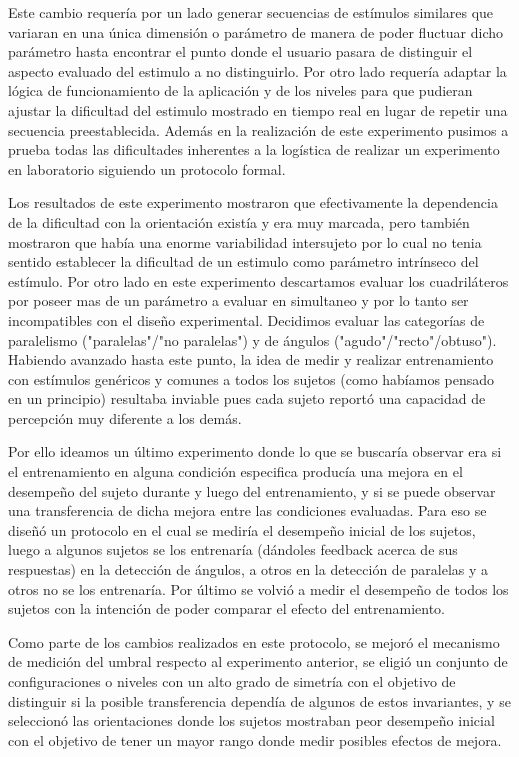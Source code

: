 \documentclass{article}
\begin{document}
    Este cambio requería por un lado generar secuencias de estímulos similares que variaran en una única dimensión o parámetro de manera de poder fluctuar dicho parámetro hasta encontrar el punto donde el usuario pasara de distinguir el aspecto evaluado del estimulo a no distinguirlo. Por otro lado requería adaptar la lógica de funcionamiento de la aplicación y de los niveles para que pudieran ajustar la dificultad del estimulo mostrado en tiempo real en lugar de repetir una secuencia preestablecida. Además en la realización de este experimento pusimos a prueba todas las dificultades inherentes a la logística de realizar un experimento en laboratorio siguiendo un protocolo formal.
    
    Los resultados de este experimento mostraron que efectivamente la dependencia de la dificultad con la orientación existía y era muy marcada, pero también mostraron que había una enorme variabilidad intersujeto por lo cual no tenia sentido establecer la dificultad de un estimulo como parámetro intrínseco del estímulo. Por otro lado en este experimento descartamos evaluar los cuadriláteros por poseer mas de un parámetro a evaluar en simultaneo y por lo tanto ser incompatibles con el diseño experimental. Decidimos evaluar las categorías de paralelismo ("paralelas"/"no paralelas") y de ángulos ("agudo"/"recto"/obtuso"). Habiendo avanzado hasta este punto, la idea de medir y realizar entrenamiento con estímulos genéricos y comunes a todos los sujetos (como habíamos pensado en un principio) resultaba inviable pues cada sujeto reportó una capacidad de percepción muy diferente a los demás. 
    
    Por ello ideamos un último experimento donde lo que se buscaría observar era si el entrenamiento en alguna condición especifica producía una mejora en el desempeño del sujeto durante y luego del entrenamiento, y si se puede observar una transferencia de dicha mejora entre las condiciones evaluadas. Para eso se diseñó un protocolo en el cual se mediría el desempeño inicial de los sujetos, luego a algunos sujetos se los entrenaría (dándoles feedback acerca de sus respuestas) en la detección de ángulos, a otros en la detección de paralelas y a otros no se los entrenaría. Por último se volvió a medir el desempeño de todos los sujetos con la intención de poder comparar el efecto del entrenamiento. 
    
    Como parte de los cambios realizados en este protocolo, se mejoró el mecanismo de medición del umbral respecto al experimento anterior, se eligió un conjunto de configuraciones o niveles con un alto grado de simetría con el objetivo de distinguir si la posible transferencia dependía de algunos de estos invariantes, y se seleccionó las orientaciones donde los sujetos mostraban peor desempeño inicial con el objetivo de tener un mayor rango donde medir posibles efectos de mejora. 
    
\end{document}
